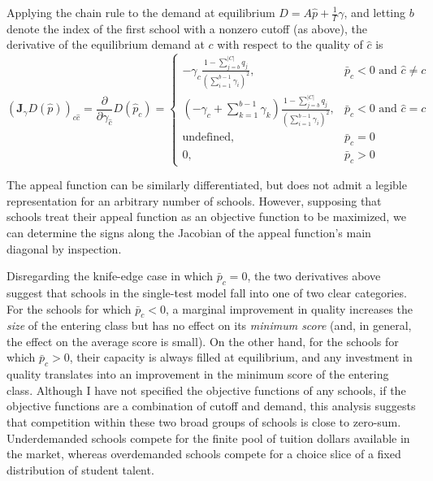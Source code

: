 \documentclass[12pt]{article}
\theoremstyle{definition}
\begin{document}
Applying the chain rule to the demand at equilibrium $D = A \hat p + \frac{1}{\Gamma} \gamma$, and letting $b$ denote the index of the first school with a nonzero cutoff (as above), the derivative of the equilibrium demand at $c$ with respect to the quality of $\hat c$ is
\begin{equation} \label{jac-gamma-demand}
\left(\mathbf{J}_\gamma D\left(\hat p\right)\right)_{c\hat c} =
\frac{\partial}{\partial\gamma_{\hat c}} D(\hat p_c) = \begin{cases}
-\gamma_c \frac{1 - \sum_{j=b}^{|C|} q_j}{\left(\sum_{i=1}^{b-1} \gamma_i\right)^2}, & \bar p_c < 0 \text{ and }\hat c \neq c \\
\left(- \gamma_c + \sum_{k=1}^{b-1} \gamma_k\right)\frac{1 - \sum_{j=b}^{|C|} q_j}{\left(\sum_{i=1}^{b-1} \gamma_i\right)^2}, & \bar p_c < 0 \text{ and }\hat c = c\\
\text{undefined}, & \bar p_c = 0 \\
0, & \bar p_c > 0
\end{cases}
\end{equation}


The appeal function can be similarly differentiated, but does not admit a legible representation for an arbitrary number of schools. However, supposing that schools treat their appeal function as an objective function to be maximized, we can determine the signs along the Jacobian of the appeal function's main diagonal by inspection.

Disregarding the knife-edge case in which $\bar p_c = 0$, the two derivatives above suggest that schools in the single-test model fall into one of two clear categories. For the schools for which $\bar p_c < 0$, a marginal improvement in quality increases the \emph{size} of the entering class but has no effect on its \emph{minimum score} (and, in general, the effect on the average score is small). On the other hand, for the schools for which $\bar p_c > 0$, their capacity is always filled at equilibrium, and any investment in quality translates into an improvement in the minimum score of the entering class. Although I have not specified the objective functions of any schools, if the objective functions are a combination of cutoff and demand, this analysis suggests that competition within these two broad groups of schools is close to zero-sum. Underdemanded schools compete for the finite pool of tuition dollars available in the market, whereas overdemanded schools compete for a choice slice of a fixed distribution of student talent.
\end{document}
